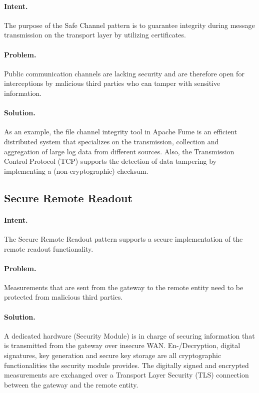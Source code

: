 \paragraph{\textbf{Intent.}} The purpose of the Safe Channel pattern is to guarantee integrity during message transmission on the transport layer by utilizing certificates.

\paragraph{\textbf{Problem.}} Public communication channels are lacking security and are therefore open for interceptions by malicious third parties who can tamper with sensitive information.

\paragraph{\textbf{Solution.}} As an example, the file channel integrity tool in Apache Fume is an efficient distributed system that specializes on the transmission, collection and aggregation of large log data from different sources. Also, the Transmission Control Protocol (TCP) supports the detection of data tampering by implementing a (non-cryptographic) checksum.


\subsection{Secure Remote Readout~\cite{Ur-Rehman2015}}
\label{p:readout}

\paragraph{\textbf{Intent.}} The Secure Remote Readout pattern supports a secure implementation of the remote readout functionality.

\paragraph{\textbf{Problem.}} Measurements that are sent from the gateway to the remote entity need to be protected from malicious third parties. 

\paragraph{\textbf{Solution.}} A dedicated hardware (Security Module) is in charge of securing information that is transmitted from the gateway over insecure WAN. En-/Decryption, digital signatures, key generation and secure key storage are all cryptographic functionalities the security module provides. The digitally signed and encrypted measurements are exchanged over a Transport Layer Security (TLS) connection between the gateway and the remote entity. 


